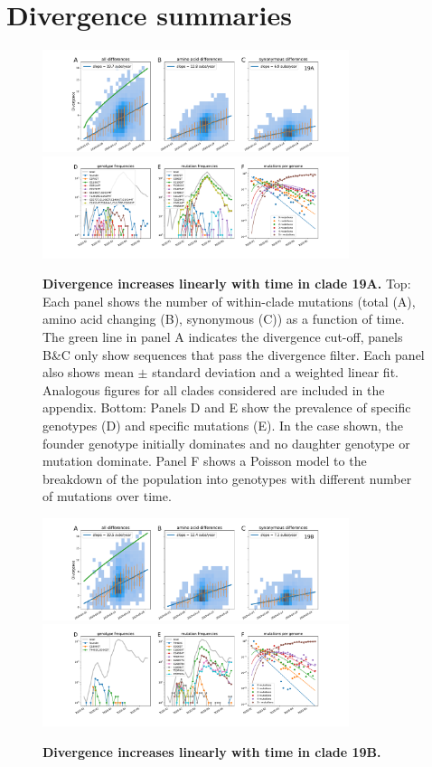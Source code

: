 \section*{Divergence summaries}

\begin{figure}[h]
    \includegraphics[width=0.8\textwidth]{figures/rtt/19A_rtt.pdf}
    \includegraphics[width=0.8\textwidth]{figures/counts/19A_counts.pdf}
    \caption{{\bf Divergence increases linearly with time in clade 19A.}
    Top: Each panel shows the number of within-clade mutations (total (A), amino acid changing (B), synonymous (C)) as a function of time.
    The green line in panel A indicates the divergence cut-off, panels B\&C only show sequences that pass the divergence filter. Each panel also shows mean $\pm$ standard deviation and a weighted linear fit. Analogous figures for all clades considered are included in the appendix.
    Bottom: Panels D and E show the prevalence of specific genotypes (D) and specific mutations (E). In the case shown, the founder genotype initially dominates and no daughter genotype or mutation dominate. Panel F shows a Poisson model to the breakdown of the population into genotypes with different number of mutations over time.
    \label{fig:19A_divergence}}
\end{figure}

\begin{figure}[h]
    \includegraphics[width=0.8\textwidth]{figures/rtt/19B_rtt.pdf}
    \includegraphics[width=0.8\textwidth]{figures/counts/19B_counts.pdf}
    \caption{{\bf Divergence increases linearly with time in clade 19B.}
    \label{fig:19B_divergence}}
\end{figure}

